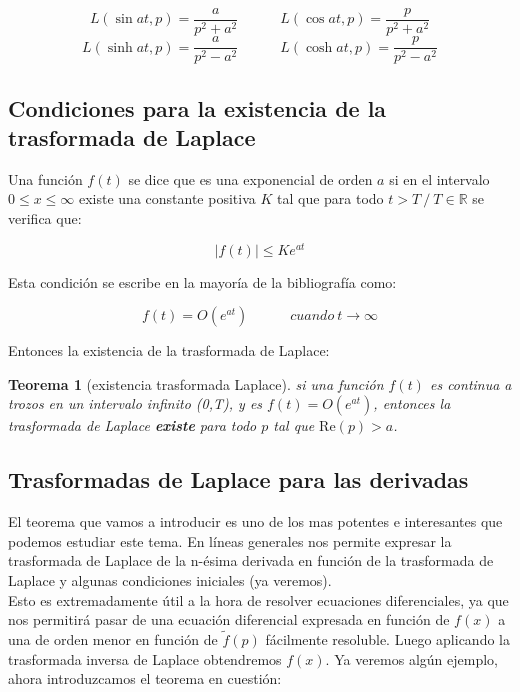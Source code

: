 \documentclass[12pt,a4paper]{book}
\newcommand{\Real}{\mathrm{Re}}
\newcommand{\tquad}{\quad  \quad \quad}
\newtheorem{theorem}{Teorema}[section]
\begin{document}
\begin{equation}
L (\sin at,p) = \dfrac{a}{p^2 + a^2} \tquad 
L (\cos at,p) = \dfrac{p}{p^2 + a^2}
\end{equation}
\begin{equation}
L (\sinh at,p) = \dfrac{a}{p^2 - a^2} \tquad 
L (\cosh at,p) = \dfrac{p}{p^2 - a^2}
\end{equation}



\subsection{Condiciones para la existencia de la trasformada de Laplace} \label{Subsec:6.3.3}

Una función $f(t)$ se dice que es una exponencial de orden $a$ si en el intervalo $0 \leq x \leq \infty$ existe una constante positiva $K$ tal que para todo $t >  T \ / \ T \in \mathbb{R}$ se verifica que:

\begin{equation}
|f(t)| \leq K e^{at}
\end{equation}

Esta condición se escribe en la mayoría de la bibliografía como:

$$ f(t) = O(e^{at}) \tquad cuando \ t \rightarrow \infty $$

Entonces la existencia de la trasformada de Laplace:

\begin{theorem}[existencia trasformada Laplace]
si una función $f(t)$ es continua a trozos en un intervalo infinito (0,T), y es $f(t)=O(e^{at})$, entonces la trasformada de Laplace \textbf{existe} para todo $p$ tal que $\Real( p ) > a$.\\
\end{theorem} 


\subsection{Trasformadas de Laplace para las derivadas}

El teorema que vamos a introducir es uno de los mas potentes e interesantes que podemos estudiar este tema. En líneas generales nos permite expresar la trasformada de Laplace de la n-ésima derivada en función de la trasformada de Laplace y algunas condiciones iniciales (ya veremos). \\

Esto es extremadamente útil a la hora de resolver ecuaciones diferenciales, ya que nos permitirá pasar de una ecuación diferencial expresada en función de $f(x)$ a una de orden menor en función de $\tilde{f}(p)$ fácilmente resoluble. Luego aplicando la trasformada inversa de Laplace obtendremos $f(x)$. Ya veremos algún ejemplo, ahora introduzcamos el teorema en cuestión:
\end{document}
